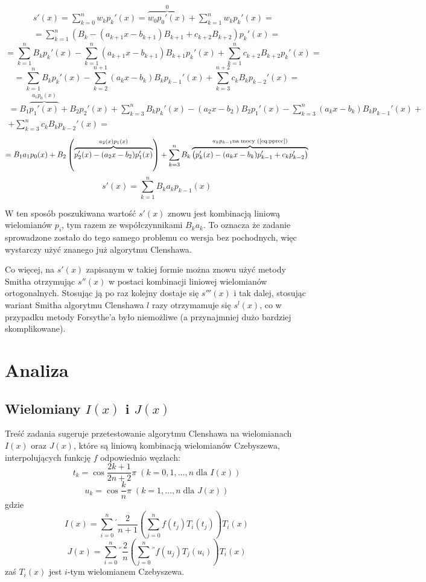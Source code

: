 \documentclass[11pt,leqno]{article}
\begin{document}
\[
\begin{split}
  s'(x)
=
  \sum_{k = 0}^n w_k p_k'(x)
=
  \overbrace{w_0 p_0'(x)}^0 + \sum_{k = 1}^n w_k p_k'(x)
=\\=
  \sum_{k = 1}^n
    (B_k - (a_{k + 1} x - b_{k + 1}) B_{k + 1} + c_{k + 2} B_{k + 2}) p_k'(x)
=
\end{split}
\]
\[
=
  \sum_{k = 1}^n
    B_k p_k'(x)
  -
  \sum_{k = 1}^n
    (a_{k + 1} x - b_{k + 1}) B_{k + 1} p_k'(x)
  +
  \sum_{k = 1}^n
    c_{k + 2} B_{k + 2} p_k'(x)
=
\]
\[
=
  \sum_{k = 1}^n
    B_k p_k'(x)
  -
  \sum_{k = 2}^{n + 1}
    (a_k x - b_k) B_k p_{k - 1}'(x)
  +
  \sum_{k = 3}^{n + 2}
    c_k B_k p_{k - 2}'(x)
=
\]
\[
\begin{split}
=
  B_1 \overbrace{p_1'(x)}^{a_1 p_0(x)}
  +
  B_2 p_2'(x)
  +
  \sum_{k = 3}^n B_k p_k'(x)
  -
  (a_2 x - b_2) B_2 p_1'(x) - \sum_{k = 3}^n (a_k x - b_k) B_k p_{k - 1}'(x)
  +\\+
  \sum_{k = 3}^n
    c_k B_k p_{k - 2}'(x)
=
\end{split}
\]
\[
=
  B_1 a_1 p_0(x) + B_2 \left( \overbrace{
    p_2'(x) - (a_2 x - b_2) p_1'(x)
  }^{a_2(x) p_1(x)} \right)
  +
  \sum_{k = 3}^n
    B_k \overbrace{
      \left(p_k'(x) - (a_k x - b_k) p_{k - 1}' + c_k p_{k - 2}' \right)
    }^{a_k p_{k - 1} \text{na mocy (\ref{eq:pprec})}}
\]
\[
  s'(x) =  \sum_{k = 1}^n B_k a_k p_{k - 1}(x)
\]

W ten sposób poszukiwana wartość $s'(x)$ znowu jest kombinacją liniową wielomianów $p_i$, tym razem ze współczynnikami $B_k a_k$. To oznacza że zadanie sprowadzone zostało do tego samego problemu co wersja bez pochodnych, więc wystarczy użyć znanego już algorytmu Clenshawa.

Co więcej, na $s'(x)$ zapisanym w takiej formie można znowu użyć metody Smitha otrzymując $s''(x)$ w postaci kombinacji liniowej wielomianów ortogonalnych. Stosując ją po raz kolejny dostaje się $s'''(x)$ i tak dalej, stosując wariant Smitha algorytmu Clenshawa $l$ razy otrzymamuje się $s^l(x)$, co w przypadku metody Forsythe'a było niemożliwe (a przynajmniej dużo bardziej skomplikowane).

\section{Analiza}

\subsection{Wielomiany $I(x)$ i $J(x)$}
Treść zadania sugeruje przetestowanie algorytmu Clenshawa na wielomianach $I(x)$ oraz $J(x)$, które są liniową kombinacją wielomianów Czebyszewa, interpolujących funkcję $f$ odpowiednio węzłach:
\[
  t_k = \cos \frac{2k + 1}{2n + 2} \pi \; (k = 0, 1, \dots, n \; \text{dla $I(x)$})
\]
\[
  u_k = \cos \frac{k}{n} \pi \; (k = 1, \dots, n \; \text{dla $J(x)$})
\]
gdzie
\[
  I(x) = \sum_{i = 0}^n {}^{'}
    \frac{2}{n + 1} \left( \sum_{j = 0}^n f(t_j) T_i(t_j) \right) T_i(x)
\]
\[
  J(x) = \sum_{i = 0}^n {}^{''}
    \frac{2}{n} \left( \sum_{j = 0}^n {}^{''} f(u_j) T_j(u_i) \right) T_i(x)
\]
zaś $T_i(x)$ jest $i$-tym wielomianem Czebyszewa.
\end{document}
